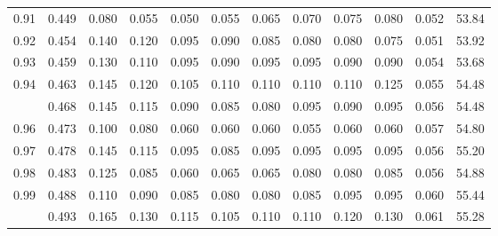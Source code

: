 \documentclass[
]{article}
\begin{document}
\begin{table}
{\begin{tabular}[t]{rrrrrrrrrrrr}
0.91 & 0.449 & 0.080 & 0.055 & 0.050 & 0.055 & 0.065 & 0.070 & 0.075 & 0.080 & 0.052 & 53.84\\
0.92 & 0.454 & 0.140 & 0.120 & 0.095 & 0.090 & 0.085 & 0.080 & 0.080 & 0.075 & 0.051 & 53.92\\
0.93 & 0.459 & 0.130 & 0.110 & 0.095 & 0.090 & 0.095 & 0.095 & 0.090 & 0.090 & 0.054 & 53.68\\
0.94 & 0.463 & 0.145 & 0.120 & 0.105 & 0.110 & 0.110 & 0.110 & 0.110 & 0.125 & 0.055 & 54.48\\
\addlinespace
0.95 & 0.468 & 0.145 & 0.115 & 0.090 & 0.085 & 0.080 & 0.095 & 0.090 & 0.095 & 0.056 & 54.48\\
0.96 & 0.473 & 0.100 & 0.080 & 0.060 & 0.060 & 0.060 & 0.055 & 0.060 & 0.060 & 0.057 & 54.80\\
0.97 & 0.478 & 0.145 & 0.115 & 0.095 & 0.085 & 0.095 & 0.095 & 0.095 & 0.095 & 0.056 & 55.20\\
0.98 & 0.483 & 0.125 & 0.085 & 0.060 & 0.065 & 0.065 & 0.080 & 0.080 & 0.085 & 0.056 & 54.88\\
0.99 & 0.488 & 0.110 & 0.090 & 0.085 & 0.080 & 0.080 & 0.085 & 0.095 & 0.095 & 0.060 & 55.44\\
\addlinespace
1.00 & 0.493 & 0.165 & 0.130 & 0.115 & 0.105 & 0.110 & 0.110 & 0.120 & 0.130 & 0.061 & 55.28\\
\bottomrule
\end{tabular}

}

\end{table}%
\end{document}
